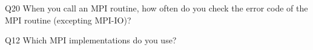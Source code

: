 \begin{description}%
\item{Q20} When you call an MPI routine, how often do you check the error code of the MPI routine  (excepting MPI-IO)?%
\item{Q12} Which MPI implementations do you use?%
\end{description}%
